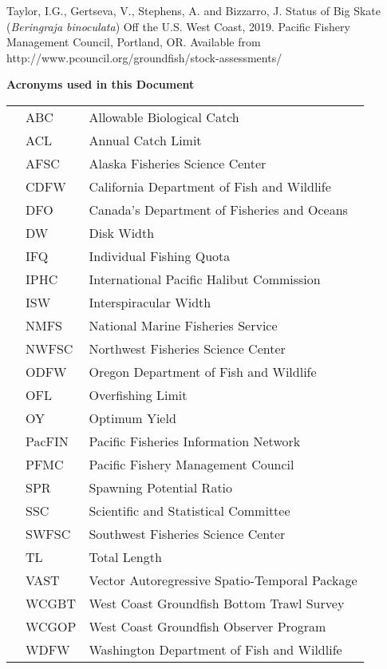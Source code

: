 \begin{center}
\begin{flushleft}
Taylor, I.G., Gertseva, V., Stephens, A. and Bizzarro, J. Status of Big Skate (\emph{Beringraja binoculata}) Off the U.S. West Coast, 2019. Pacific Fishery Management Council, Portland, OR. Available from http://www.pcouncil.org/groundfish/stock-assessments/
\end{flushleft}

\newpage{\thispagestyle{empty}}



\begin{flushleft}
\large{\textbf{Acronyms used in this Document}}
\end{flushleft}

\vspace{.5cm}

\renewcommand{\arraystretch}{1.2}

\begin{table}[ht]
\begin{tabular}{rll}
\hline
 &  ABC & Allowable Biological Catch \\ 
 &  ACL & Annual Catch Limit \\ 
 &  AFSC & Alaska Fisheries Science Center \\ 
 &  CDFW & California Department of Fish and Wildlife \\ 
 &  DFO & Canada's Department of Fisheries and Oceans \\
 &  DW & Disk Width \\
 &  IFQ & Individual Fishing Quota \\
 &  IPHC & International Pacific Halibut Commission \\
 &  ISW & Interspiracular Width \\
 &  NMFS & National Marine Fisheries Service \\
 &  NWFSC & Northwest Fisheries Science Center \\
 &  ODFW & Oregon Department of Fish and Wildlife \\
 &  OFL & Overfishing Limit \\
 &  OY & Optimum Yield \\
 &  PacFIN & Pacific Fisheries Information Network \\
 &  PFMC & Pacific Fishery Management Council \\
 &  SPR & Spawning Potential Ratio \\
 &  SSC & Scientific and Statistical Committee \\
 &  SWFSC & Southwest Fisheries Science Center \\
 &  TL & Total Length \\
 &  VAST & Vector Autoregressive Spatio-Temporal Package \\
 &  WCGBT & West Coast Groundfish Bottom Trawl Survey \\
 &  WCGOP & West Coast Groundfish Observer Program \\
 &  WDFW & Washington Department of Fish and Wildlife \\
   \hline
\end{tabular}
\end{table}


\end{center}
